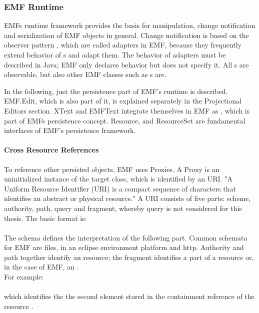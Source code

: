 \subsubsection{EMF Runtime}
EMFs runtime framework provides the basis for manipulation, change notification and serialization of EMF objects in general. \cite{EMF2nd} Change notification is based on the observer pattern \cite{patterns}, which are called adapters in EMF, because they frequently extend behavior of s and adapt them. The behavior of adapters must be described in Java; EMF only declares behavior but does not specify it. All s are observable, but also other EMF classes such as s are.

In the following, just the persistence part of EMF's runtime is described. EMF.Edit, which is also part of it, is explained separately in the Projectional Editors section. XText \cite{XTextMan} and EMFText \cite{EMFTextMan} integrate themselves in EMF as , which is part of EMFs persistence concept. Resource, and ResourceSet are fundamental interfaces of EMF's persistence framework.

\paragraph{Cross Resource References}
To reference other persisted objects, EMF uses Proxies. A Proxy is an uninitialized instance of the target class, which is identified by an URI. "A Uniform Resource Identifier (URI) is a compact sequence of characters that identifies an abstract or physical resource." \cite{URI} A URI consists of five parts: scheme, authority, path, query and fragment, whereby query is not considered for this thesis. The basic format is:\\
 \\
The schema defines the interpretation of the following part. Common schemata for EMF are files, in an eclipse environment platform and http. Authority and path together identify an resource; the fragment identifies a part of a resource or, in the case of EMF, an .\\
For example:\\
\\
which identifies the the second element stored in the containment reference  of the resource .


